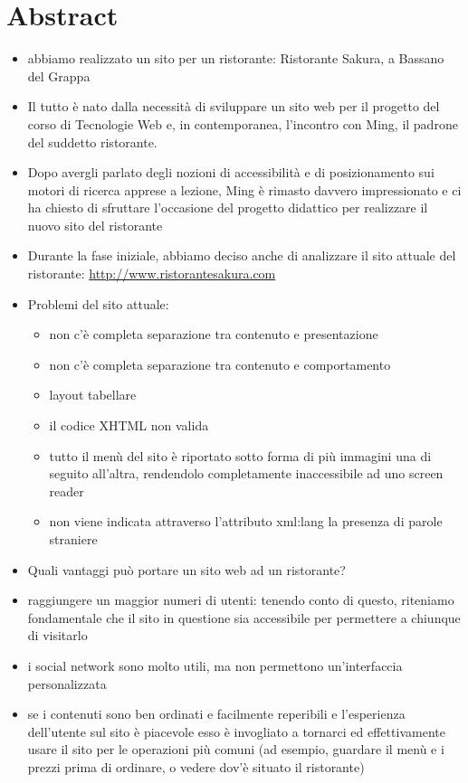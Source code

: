 \documentclass[../relazione.tex]{subfiles}
\begin{document}
\section{Abstract}
	\begin{itemize}
		\item abbiamo realizzato un sito per un ristorante: Ristorante Sakura, a Bassano del Grappa
		\item Il tutto è nato dalla necessità di sviluppare un sito web per il progetto del corso di Tecnologie Web e, in contemporanea, l'incontro con Ming, il padrone del suddetto ristorante.
		\item Dopo avergli parlato degli nozioni di accessibilità e di posizionamento sui motori di ricerca apprese a lezione, Ming è rimasto davvero impressionato e ci ha chiesto di sfruttare l'occasione del progetto didattico per realizzare il nuovo sito del ristorante
		\item Durante la fase iniziale, abbiamo deciso anche di analizzare il sito attuale del ristorante: \url{http://www.ristorantesakura.com}
		\item Problemi del sito attuale:
		\begin{itemize}
			\item non c'è completa separazione tra contenuto e presentazione
			\item non c'è completa separazione tra contenuto e comportamento
			\item layout tabellare
			\item il codice XHTML non valida
			\item tutto il menù del sito è riportato sotto forma di più immagini una di seguito all'altra, rendendolo completamente inaccessibile ad uno screen reader
			\item non viene indicata attraverso l'attributo xml:lang la presenza di parole straniere
		\end{itemize}
		\item Quali vantaggi può portare un sito web ad un ristorante?
		\item raggiungere un maggior numeri di utenti: tenendo conto di questo, riteniamo fondamentale che il sito in questione sia accessibile per permettere a chiunque di visitarlo
		\item i social network sono molto utili, ma non permettono un'interfaccia personalizzata
		\item se i contenuti sono ben ordinati e facilmente reperibili e l'esperienza dell'utente sul sito è piacevole esso è invogliato a tornarci ed effettivamente usare il sito per le operazioni più comuni (ad esempio, guardare il menù e i prezzi prima di ordinare, o vedere dov'è situato il ristorante)
	\end{itemize}
\end{document}
